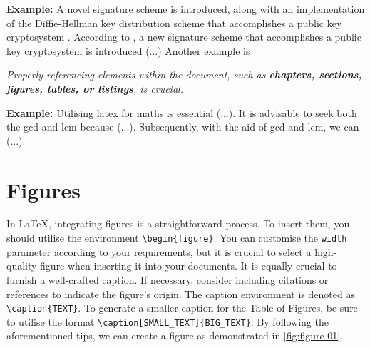 {\noindent\textbf{Example:} A novel signature scheme is introduced, along with an implementation of the Diffie-Hellman key distribution scheme that accomplishes a public key cryptosystem \citep{Elgamal1985}. According to \citet{Elgamal1985}, a new signature scheme that accomplishes a public key cryptosystem is introduced (...) Another example is \cite{Takahashi2019}



\begin{block}[tip]
\textit{Properly referencing elements within the document, such as \textbf{chapters, sections, figures, tables, or listings}, is crucial.}
\end{block}

\vspace{.875em}
\textbf{Example:} Utilising \Gls{latex} for \Gls{maths} is essential (...). It is advisable to seek both the \acrfull{gcd} and \acrfull{lcm} because (...). Subsequently, with the aid of \acrshort{gcd} and \acrshort{lcm}, we can (...).

\section{Figures}
In \LaTeX, integrating figures is a straightforward process. To insert them, you should utilise the environment \verb|\begin{figure}|. You can customise the \verb|width| parameter according to your requirements, but it is crucial to select a high-quality figure when inserting it into your documents. It is equally crucial to furnish a well-crafted caption. If necessary, consider including citations or references to indicate the figure's origin. The caption environment is denoted as \verb|\caption{TEXT}|. To generate a smaller caption for the Table of Figures, be sure to utilise the format \verb|\caption[SMALL_TEXT]{BIG_TEXT}|. By following the aforementioned tips, we can create a figure as demonstrated in \autoref{fig:figure-01}.

}
